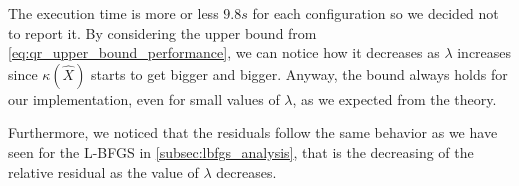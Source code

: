 \noindent The execution time is more or less $9.8s$ for each configuration so we decided not to report it. By considering the upper bound from \eqref{eq:qr_upper_bound_performance}, we can notice how it decreases as $\lambda$ increases since $\kappa(\hat{X})$ starts to get bigger and bigger. Anyway, the bound always holds for our implementation, even for small values of $\lambda$, as we expected from the theory.
\vspace{3mm}

\noindent Furthermore, we noticed that the residuals follow the same behavior as we have seen for the L-BFGS in \ref{subsec:lbfgs_analysis}, that is the decreasing of the relative residual as the value of $\lambda$ decreases.
